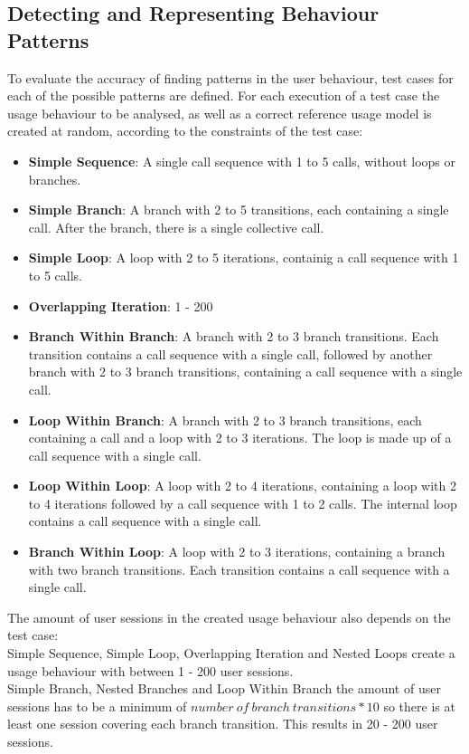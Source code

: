\documentclass[10pt,a4paper]{article}
\begin{document}
	\subsection{Detecting and Representing Behaviour Patterns}
	To evaluate the accuracy of finding patterns in the user behaviour, test cases for each of the possible patterns are defined. For each execution of a test case the usage behaviour to be analysed, as well as a correct reference usage model is created at random, according to the constraints of the test case:
	\begin{itemize}
		\item \textbf{Simple Sequence}: A single call sequence with 1 to 5 calls, without loops or branches.
		\item \textbf{Simple Branch}: A branch with 2 to 5 transitions, each containing a single call. After the branch, there is a single collective call.
		\item \textbf{Simple Loop}: A loop with 2 to 5 iterations, containig a call sequence with 1 to 5 calls.
		\item \textbf{Overlapping Iteration}: 1 - 200
		\item \textbf{Branch Within Branch}: A branch with 2 to 3 branch transitions. Each transition contains a call sequence with a single call, followed by another branch with 2 to 3 branch transitions, containing a call sequence with a single call.
		\item \textbf{Loop Within Branch}: A branch with 2 to 3 branch transitions, each containing a call and a loop with 2 to 3 iterations. The loop is made up of a call sequence with a single call.
		\item \textbf{Loop Within Loop}: A loop with 2 to 4 iterations, containing a loop with 2 to 4 iterations followed by a call sequence with 1 to 2 calls. The internal loop contains a call sequence with a single call.
		\item \textbf{Branch Within Loop}: A loop with 2 to 3 iterations, containing a branch with two branch transitions. Each transition contains a call sequence with a single call.
	\end{itemize}
	The amount of user sessions in the created usage behaviour also depends on the test case:\\
	Simple Sequence, Simple Loop, Overlapping Iteration and Nested Loops create a usage behaviour with between 1 - 200 user sessions.\\
	Simple Branch, Nested Branches and Loop Within Branch the amount of user sessions has to be a minimum of $number\ of\ branch\ transitions * 10$ so there is at least one session covering each branch transition. This results in 20 - 200 user sessions.\\
\end{document}
